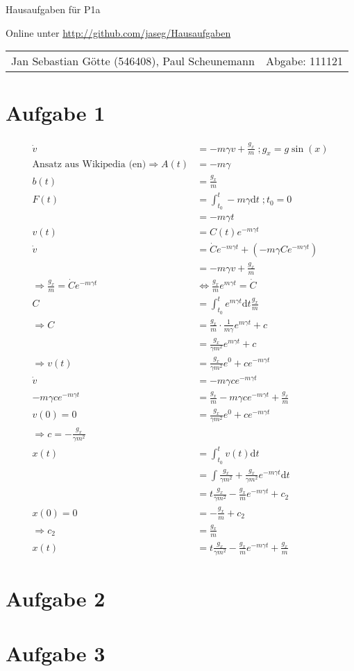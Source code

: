 \documentclass[12pt,a4paper,notitlepage]{article}
\newcommand{\diff}{\mathrm{d}}
\newcommand{\aufgabe}[1]{\section*{\setcounter{section}{#1}Aufgabe #1}}
\begin{document}
\begin{center}
\Large Hausaufgaben für P1a

\normalsize Online unter \url{http://github.com/jaseg/Hausaufgaben}
\end{center}
\begin{tabularx}{\textwidth}{Xr}
Jan Sebastian Götte (546408), Paul Scheunemann&Abgabe: 111121
\end{tabularx}
\aufgabe{1}
\begin{align}
\dot v&=-m\gamma v+\frac{g_x}{m}\;;g_x=g\sin(x)\\
\text{Ansatz aus Wikipedia (en)}
\Rightarrow A(t)&=-m\gamma\\
b(t)&=\frac{g_x}{m}\\
F(t)&=\int_{t_0}^t-m\gamma\diff t\;;t_0=0\\
&=-m\gamma t\\
v(t)&=C(t)e^{-m\gamma t}\\
\dot v&=\dot Ce^{-m\gamma t}+\left(-m\gamma Ce^{-m\gamma t}\right)\\
&=-m\gamma v+\frac{g_x}{m}\\
\Rightarrow\frac{g_x}{m}=\dot Ce^{-m\gamma t}&\Leftrightarrow\frac{g_x}{m}e^{m\gamma t}=\dot C\\
C&=\int_{t_0}^te^{m\gamma t}\diff t\frac{g_x}{m}\\
\Rightarrow C&=\frac{g_x}{m}\cdot\frac{1}{m\gamma}e^{m\gamma t}+c\\
&=\frac{g_x}{\gamma m^2}e^{m\gamma t}+c\\
\Rightarrow v(t)&=\frac{g_x}{\gamma m^2}e^0+ce^{-m\gamma t}\\
\dot v&=-m\gamma ce^{-m\gamma t}\\
-m\gamma ce^{-m\gamma t}&=\frac{g_x}{m}-m\gamma ce^{-m\gamma t}+\frac{g_x}{m}\\
v(0)=0&=\frac{g_x}{\gamma m^2}e^0+ce^{-m\gamma t}\\
\Rightarrow c=-\frac{g_x}{\gamma m^2}\\
x(t)&=\int_{t_0}^tv(t)\diff t\\
&=\int \frac{g_x}{\gamma m^2}+\frac{g_x}{\gamma m^2}e^{-m\gamma t}\diff t\\
&=t\frac{g_x}{\gamma m^2}-\frac{g_x}{m}e^{-m\gamma t}+c_2\\
x(0)=0&=-\frac{g_x}{m}+c_2\\
\Rightarrow c_2&=\frac{g_x}{m}\\
x(t)&=t\frac{g_x}{\gamma m^2}-\frac{g_x}{m}e^{-m\gamma t}+\frac{g_x}{m}
\end{align}
\aufgabe{2}
\aufgabe{3}
\end{document}
